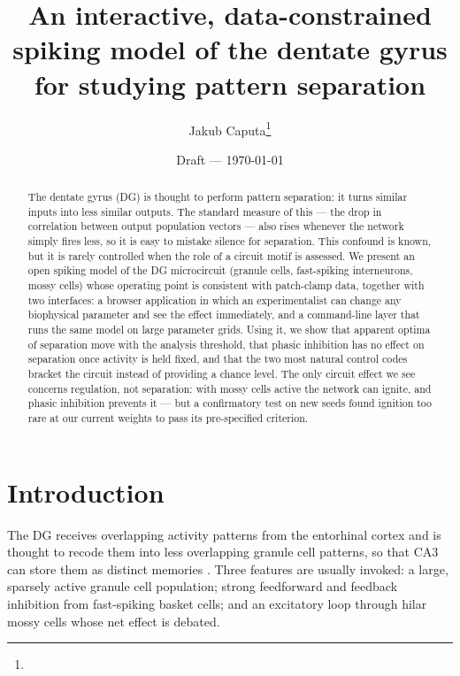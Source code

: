 \documentclass[11pt,a4paper]{article}
\title{\textbf{An interactive, data-constrained spiking model of the dentate
gyrus for studying pattern separation}}
\author{Jakub Caputa\thanks{\todo{affiliation, e-mail}} \and \todo{co-authors}}
\date{Draft --- \today}
\begin{document}
\maketitle

\begin{abstract}
\noindent
The dentate gyrus (DG) is thought to perform pattern separation: it turns similar
inputs into less similar outputs. The standard measure of this --- the drop in
correlation between output population vectors --- also rises whenever the network
simply fires less, so it is easy to mistake silence for separation. This confound
is known, but it is rarely controlled when the role of a circuit motif is assessed. We present an
open spiking model of the DG microcircuit (granule cells, fast-spiking
interneurons, mossy cells) whose operating point is consistent with patch-clamp data,
together with two interfaces: a browser application in which an experimentalist
can change any biophysical parameter and see the effect immediately, and a
command-line layer that runs the same model on large parameter grids. Using it, we
show that apparent optima of separation move with the analysis threshold, that
phasic inhibition has no effect on separation once activity is held fixed, and that
the two most natural control codes bracket the circuit instead of providing a chance
level. The only circuit effect we see concerns regulation, not separation: with
mossy cells active the network can ignite, and phasic inhibition prevents it ---
but a confirmatory test on new seeds found ignition too rare at our current
weights to pass its pre-specified criterion.
\end{abstract}

\section{Introduction}

The DG receives overlapping activity patterns from the entorhinal cortex and is
thought to recode them into less overlapping granule cell patterns, so that CA3
can store them as distinct memories \cite{marr1971,treves1994,leutgeb2007}. Three
features are usually invoked: a large, sparsely active granule cell population;
strong feedforward and feedback inhibition from fast-spiking basket cells; and
an excitatory loop through hilar mossy cells whose net effect is debated.
\end{document}
